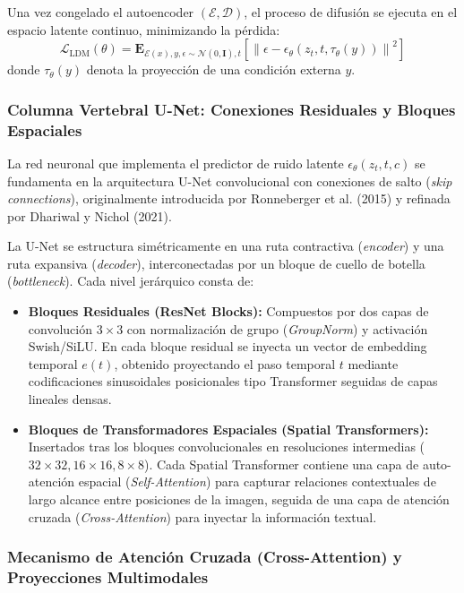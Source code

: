 Una vez congelado el autoencoder $(\mathcal{E}, \mathcal{D})$, el proceso de difusión se ejecuta en el espacio latente continuo, minimizando la pérdida:
\begin{equation}
\mathcal{L}_{\mathrm{LDM}}(\theta) = \mathbf{E}_{\mathcal{E}(x), y, \epsilon \sim \mathcal{N}(0, \mathbf{I}), t} \left[ \left\| \epsilon - \epsilon_\theta(z_t, t, \tau_\theta(y)) \right\|^2 \right]
\end{equation}
donde $\tau_\theta(y)$ denota la proyección de una condición externa $y$.

\subsubsection{Columna Vertebral U-Net: Conexiones Residuales y Bloques Espaciales}

La red neuronal que implementa el predictor de ruido latente $\epsilon_\theta(z_t, t, c)$ se fundamenta en la arquitectura U-Net convolucional con conexiones de salto (\textit{skip connections}), originalmente introducida por Ronneberger et al. (2015) y refinada por Dhariwal y Nichol (2021). 

La U-Net se estructura simétricamente en una ruta contractiva (\textit{encoder}) y una ruta expansiva (\textit{decoder}), interconectadas por un bloque de cuello de botella (\textit{bottleneck}). Cada nivel jerárquico consta de:
\begin{itemize}
    \item \textbf{Bloques Residuales (ResNet Blocks):} Compuestos por dos capas de convolución $3 \times 3$ con normalización de grupo (\textit{GroupNorm}) y activación Swish/SiLU. En cada bloque residual se inyecta un vector de embedding temporal $e(t)$, obtenido proyectando el paso temporal $t$ mediante codificaciones sinusoidales posicionales tipo Transformer seguidas de capas lineales densas.
    \item \textbf{Bloques de Transformadores Espaciales (Spatial Transformers):} Insertados tras los bloques convolucionales en resoluciones intermedias ($32 \times 32, 16 \times 16, 8 \times 8$). Cada Spatial Transformer contiene una capa de auto-atención espacial (\textit{Self-Attention}) para capturar relaciones contextuales de largo alcance entre posiciones de la imagen, seguida de una capa de atención cruzada (\textit{Cross-Attention}) para inyectar la información textual.
\end{itemize}

\subsubsection{Mecanismo de Atención Cruzada (Cross-Attention) y Proyecciones Multimodales}

